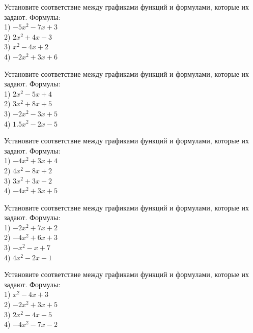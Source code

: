 \documentclass[4apaper]{article}
\begin{document}
\begin{taskBN}{32}
Установите соответствие между графиками функций и формулами, которые их задают. Формулы: \\1) $-5x^2-7x+3$\\2) $2x^2+4x-3$\\3) $x^2-4x+2$\\4) $-2x^2+3x+6$
\end{taskBN}

\begin{taskBN}{33}
Установите соответствие между графиками функций и формулами, которые их задают. Формулы: \\1) $2x^2-5x+4$\\2) $3x^2+8x+5$\\3) $-2x^2-3x+5$\\4) $1.5x^2-2x-5$
\end{taskBN}

\begin{taskBN}{34}
Установите соответствие между графиками функций и формулами, которые их задают. Формулы: \\1) $-4x^2+3x+4$\\2) $4x^2-8x+2$\\3) $3x^2+3x-2$\\4) $-4x^2+3x+5$
\end{taskBN}

\begin{taskBN}{35}
Установите соответствие между графиками функций и формулами, которые их задают. Формулы: \\1) $-2x^2+7x+2$\\2) $-4x^2+6x+3$\\3) $-x^2-x+7$\\4) $4x^2-2x-1$
\end{taskBN}

\begin{taskBN}{36}
Установите соответствие между графиками функций и формулами, которые их задают. Формулы: \\1) $x^2-4x+3$\\2) $-2x^2+3x+5$\\3) $2x^2-4x-5$\\4) $-4x^2-7x-2$
\end{taskBN}
\end{document}
